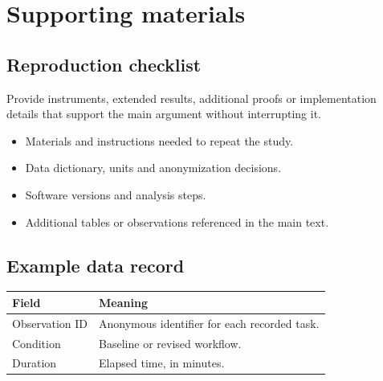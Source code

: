\documentclass[11pt,a4paper,oneside]{report}
\begin{document}
\chapter{Supporting materials}
\label{app:materials}
\section{Reproduction checklist}
Provide instruments, extended results, additional proofs or implementation
details that support the main argument without interrupting it.
\begin{itemize}
\item Materials and instructions needed to repeat the study.
\item Data dictionary, units and anonymization decisions.
\item Software versions and analysis steps.
\item Additional tables or observations referenced in the main text.
\end{itemize}
\section{Example data record}
\begin{tabularx}{\linewidth}{@{}lX@{}}
\toprule
\textbf{Field} & \textbf{Meaning}\\
\midrule
Observation ID & Anonymous identifier for each recorded task.\\
Condition & Baseline or revised workflow.\\
Duration & Elapsed time, in minutes.\\
\bottomrule
\end{tabularx}
\end{document}
